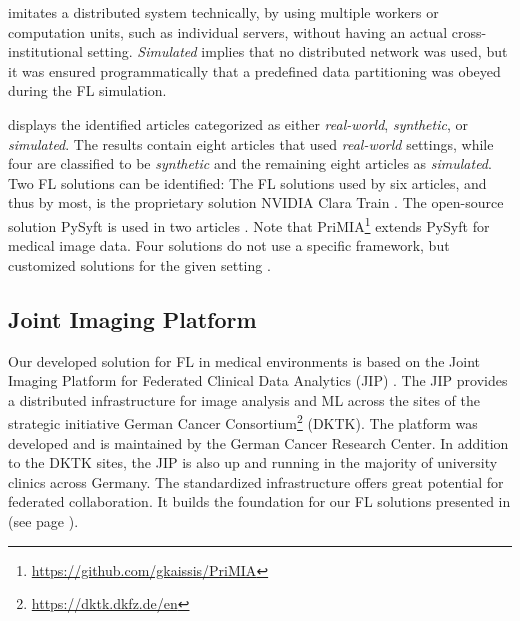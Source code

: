 imitates a distributed system technically, by using multiple workers or computation units, such as individual servers, without having an actual cross-institutional setting.
\textit{Simulated} implies that no distributed network was used, but it was ensured programmatically that a predefined data partitioning was obeyed during the FL simulation.

 displays the identified articles categorized as either \textit{real-world}, \textit{synthetic}, or \textit{simulated}. The results contain eight articles that used \textit{real-world} settings, while four are classified to be \textit{synthetic} and the remaining eight articles as \textit{simulated}.
Two FL solutions can be identified: The FL solutions used by six articles, and thus by most, is the proprietary solution NVIDIA Clara Train \citep{Wang2020AutomatedLearning, Roth2020FederatedImplementation, Sarma2021FederatedSharing, Yang2021FederatedJapan, Li2019Privacy-preservingSegmentation, Flores2021FederatedPatients}. The open-source solution PySyft is used in two articles \citep{Kaissis2021End-to-endImaging, Lee2021FederatedEnvironment}. Note that PriMIA\footnote{\url{https://github.com/gkaissis/PriMIA}} extends PySyft for medical image data.   Four solutions do not use a specific framework, but customized solutions for the given setting \citep{Xu2020ADiagnosis, Remedios2020DistributedSegmentation, Remedios2019DistributedInjury, Dou2021FederatedStudy}.



\subsection{Joint Imaging Platform}
\label{subsec:JIP}

Our developed solution for FL in medical environments is based on the Joint Imaging Platform for Federated Clinical Data Analytics (JIP) \citep{Scherer2020JointAnalytics}.
The JIP provides a distributed infrastructure for image analysis and ML across the sites of the strategic initiative German Cancer Consortium\footnote{\url{https://dktk.dkfz.de/en}} (DKTK). The platform was developed and is maintained by the German Cancer Research Center. In addition to the DKTK sites, the JIP is also up and running in the majority of university clinics across Germany. The standardized infrastructure offers great potential for federated collaboration. It builds the foundation for our FL solutions presented in  (see page \pageref{sec:Methods}).

